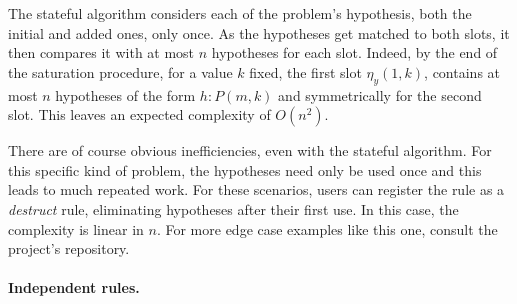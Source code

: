 \documentclass[runningheads]{llncs}
\begin{document}
The stateful algorithm considers each of the problem's hypothesis, both the initial and added ones, only once.
As the hypotheses get matched to both slots, it then compares it with at most $n$ hypotheses for each slot.
Indeed, by the end of the saturation procedure, for a value $k$ fixed, the first slot $\eta_y(1,k)$, contains at most $n$ hypotheses of the form $h : P(m,k)$ and symmetrically for the second slot.
This leaves an expected complexity of $O(n^2)$.

There are of course obvious inefficiencies, even with the stateful algorithm.
For this specific kind of problem, the hypotheses need only be used once and this leads to much repeated work.
For these scenarios, users can register the rule as a \textit{destruct} rule, eliminating hypotheses after their first use.
In this case, the complexity is linear in $n$.
For more edge case examples like this one, consult the project's repository.

\paragraph{Independent rules.}

\begin{figure}
        \end{figure}
\end{document}
